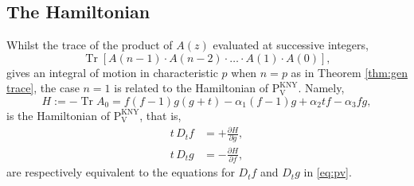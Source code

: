 \documentclass[a4paper,reqno]{amsart}
\numberwithin{equation}{section}
\numberwithin{figure}{section}
\theoremstyle{remark}
\newcommand\Pfive{\textrm{P}_{\textrm{V}}}
\begin{document}
\subsection{The Hamiltonian} Whilst the trace of the product of $A(z)$ evaluated at successive integers,
$$\operatorname{Tr}[A(n-1)\cdot A(n-2)\cdot\ldots\cdot A(1)\cdot A(0)],$$
gives an integral of motion in characteristic $p$ when $n=p$ as in Theorem \ref{thm:gen trace}, the case $n=1$ is related to the Hamiltonian of $\Pfive^\text{KNY}$. Namely,
\begin{equation*}
    H:=-\operatorname{Tr}A_0=f(f-1)g(g+t)-\alpha_1(f-1)g+\alpha_2 t f-\alpha_3 f g,
\end{equation*}
is the Hamiltonian of $\Pfive^\text{KNY}$, that is,
\begin{align*}
    t\,D_tf&=+\frac{\partial H}{\partial g},\\
    t\,D_tg&=-\frac{\partial H}{\partial f},
\end{align*}
are respectively equivalent to the equations for $D_tf$ and $D_tg$ in \eqref{eq:pv}.
\end{document}
